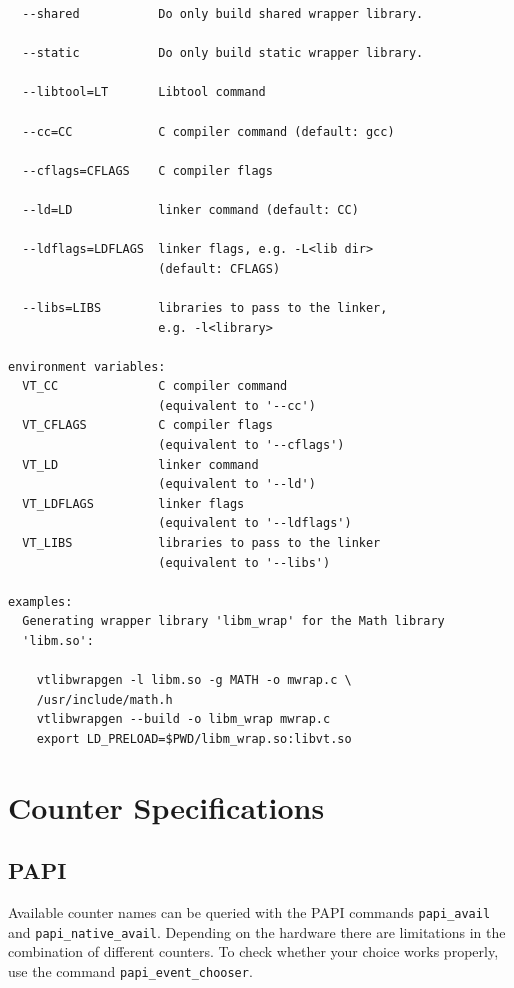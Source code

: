 \documentclass[a4paper,twoside,12pt,BCOR12mm]{scrbook}
\begin{document}
\begin{latexonly}
\begin{verbatim}
  --shared           Do only build shared wrapper library.

  --static           Do only build static wrapper library.

  --libtool=LT       Libtool command

  --cc=CC            C compiler command (default: gcc)

  --cflags=CFLAGS    C compiler flags

  --ld=LD            linker command (default: CC)

  --ldflags=LDFLAGS  linker flags, e.g. -L<lib dir>
                     (default: CFLAGS)

  --libs=LIBS        libraries to pass to the linker, 
                     e.g. -l<library>

environment variables:
  VT_CC              C compiler command 
                     (equivalent to '--cc')
  VT_CFLAGS          C compiler flags 
                     (equivalent to '--cflags')
  VT_LD              linker command 
                     (equivalent to '--ld')
  VT_LDFLAGS         linker flags 
                     (equivalent to '--ldflags')
  VT_LIBS            libraries to pass to the linker
                     (equivalent to '--libs')

examples:
  Generating wrapper library 'libm_wrap' for the Math library
  'libm.so':

    vtlibwrapgen -l libm.so -g MATH -o mwrap.c \
    /usr/include/math.h
    vtlibwrapgen --build -o libm_wrap mwrap.c
    export LD_PRELOAD=$PWD/libm_wrap.so:libvt.so
\end{verbatim}
\latex{\end{small}}
\end{latexonly}


\chapter{Counter Specifications}

\section{PAPI}
\label{sec:papi}

Available counter names can be queried with the PAPI commands 
\texttt{papi\_avail} and \texttt{papi\_native\_avail}.
Depending on the hardware there are limitations in the combination 
of different counters. To check whether your choice works properly, 
use the command \texttt{papi\_event\_chooser}.
\end{document}
